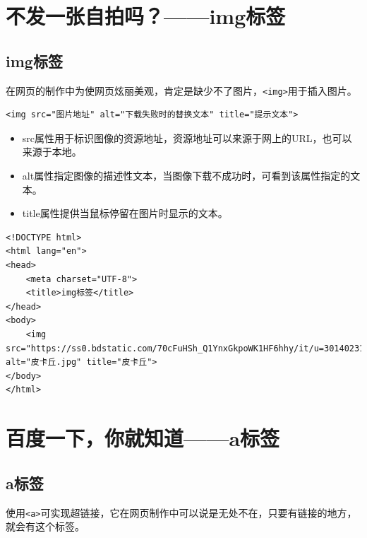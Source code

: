 \newpage

\section{不发一张自拍吗？——img标签}

\subsection{img标签}

在网页的制作中为使网页炫丽美观，肯定是缺少不了图片，\lstinline|<img>|用于插入图片。 \\

\begin{lstlisting}[style=htmlcssjs]
<img src="图片地址" alt="下载失败时的替换文本" title="提示文本">
\end{lstlisting}

\begin{itemize}
    \item src属性用于标识图像的资源地址，资源地址可以来源于网上的URL，也可以来源于本地。

    \item alt属性指定图像的描述性文本，当图像下载不成功时，可看到该属性指定的文本。

    \item title属性提供当鼠标停留在图片时显示的文本。
\end{itemize}

\begin{lstlisting}[style=htmlcssjs, title=img标签, breaklines=true, breakatwhitespace=false]
<!DOCTYPE html>
<html lang="en">
<head>
    <meta charset="UTF-8">
    <title>img标签</title>
</head>
<body>
    <img src="https://ss0.bdstatic.com/70cFuHSh_Q1YnxGkpoWK1HF6hhy/it/u=3014023147,616635741&fm=26&gp=0.jpg" alt="皮卡丘.jpg" title="皮卡丘">
</body>
</html>
\end{lstlisting}

\newpage

\section{百度一下，你就知道——a标签}

\subsection{a标签}

使用\lstinline|<a>|可实现超链接，它在网页制作中可以说是无处不在，只要有链接的地方，就会有这个标签。 \\

